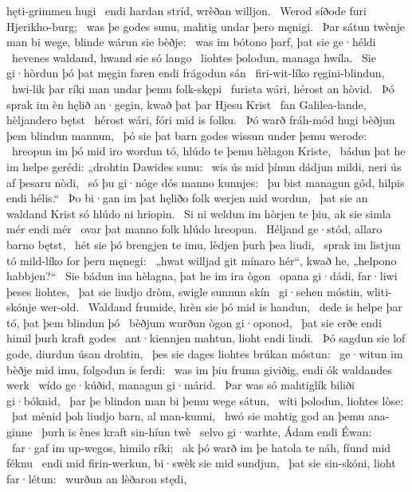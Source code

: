 hęti-grimmen hugi \hld\ endi hardan stríd,
wrèðan willjon. \hld\ Werod síðode
furi Hjerikho-burg; \hld\ was þe godes sunu,
mahtig undar þero męnigi. \hld\ Þar sátun twènje man bi wege,
blinde wárun sie bèðje: \hld\ was im bótono þarf,
þat sie ge·héldi \hld\ hevenes waldand,
hwand sie só lango \hld\ liohtes þolodun,
managa hwíla. \hld\ Sie gi·hòrdun þó þat męgin faren
endi frágodun sán \hld\ firi-wit-líko
ręgini-blindun, \hld\ hwi-lik þar ríki man
undar þemu folk-skępi \hld\ furista wári,
hérost an hòvid. \hld\ Þó sprak im èn hęlið an·gegin,
kwað þat þar Hjesu Krist \hld\ fan Galilea-lande,
hèljandero bętst \hld\ hérost wári,
fóri mid is folku. \hld\ Þó warð fráh-mód hugi
bèðjun þem blindun mannun, \hld\ þó sie þat barn godes
wissun under þemu werode: \hld\ hreopun im þó mid iro wordun tó,
hlúdo te þemu hèlagon Kriste, \hld\ bádun þat he im helpe gerédi:
„drohtin Dawides sunu: \hld\ wis ús mid þínun dádjun mildi,
neri ús af þesaru nòdi, \hld\ só þu gi·nóge dós
manno kunnjes: \hld\ þu bist managun gód,
hilpis endi hélis.“ \hld\ Þo bi·gan im þat hęliðo folk
werjen mid wordun, \hld\ þat sie an waldand Krist
só hlúdo ni hriopin. \hld\ Si ni weldun im hòrjen te þiu,
ak sie simla mér endi mér \hld\ ovar þat manno folk
hlúdo hreopun. \hld\ Héljand ge·stód,
allaro barno bętst, \hld\ hét sie þó brengjen te imu,
lèdjen þurh þea liudi, \hld\ sprak im listjun tó
mild-líko for þeru męnegi: \hld\ „hwat willjad git mínaro hér“, kwað he,
„helpono habbjen?“ \hld\ Sie bádun ina hèlagna,
þat he im ira ògon \hld\ opana gi·dádi,
far·liwi þeses liohtes, \hld\ þat sie liudjo dròm,
swigle sunnun skín \hld\ gi·sehen móstin,
wliti-skónje wer-old. \hld\ Waldand frumide,
hrèn sie þó mid is handun, \hld\ dede is helpe þar tó,
þat þem blindun þó \hld\ bèðjum wurðun
ògon gi·oponod, \hld\ þat sie erðe endi himil
þurh kraft godes \hld\ ant·kiennjen mahtun,
lioht endi liudi. \hld\ Þó sagdun sie lof gode,
diurdun úsan drohtin, \hld\ þes sie dages liohtes
brúkan móstun: \hld\ ge·witun im bèðje mid imu,
folgodun is ferdi: \hld\ was im þiu fruma giviðig,
endi ók waldandes werk \hld\ wído ge·kúðid,
managun gi·márid. \hld\ Þar was só mahtiglík
biliði gi·bóknid, \hld\ þar þe blindon man
bi þemu wege sátun, \hld\ wíti þolodun,
liohtes lòse: \hld\ þat mènid þoh liudjo barn,
al man-kunni, \hld\ hwó sie mahtig god
an þemu ana-ginne \hld\ þurh is ènes kraft
sin-híun twè \hld\ selvo gi·warhte,
Ádam endi Éwan: \hld\ far·gaf im up-wegos,
himilo ríki; \hld\ ak þó warð im þe hatola te náh,
fíund mid féknu \hld\ endi mid firin-werkun,
bi·swèk sie mid sundjun, \hld\ þat sie sin-skóni,
lioht far·létun: \hld\ wurðun an lèðaron stędi,
